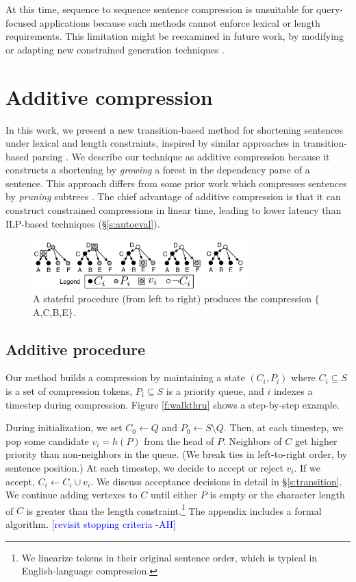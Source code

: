 \documentclass[11pt,a4paper]{article}
\newcommand{\ahcomment}[1]{\textcolor{blue}{[#1 -AH]}}
\begin{document}
At this time, sequence to sequence sentence compression \cite{filippova2015sentence} is unsuitable for query-focused applications because such methods cannot enforce lexical or length requirements. This limitation might be reexamined in future work, by modifying or adapting new constrained generation techniques \cite{N18-1119,aaimh}.

\section{Additive compression}\label{s:system}

In this work, we present a new transition-based method for shortening sentences under lexical and length constraints, inspired by similar approaches in transition-based parsing \cite{nivre2003}. We describe our technique as additive compression because it constructs a shortening by \textit{growing} a forest in the dependency parse of a sentence. This approach differs from some prior work which
compresses sentences by \textit{pruning} subtrees \cite{Knight2000StatisticsBasedS,berg2011jointly,almeida2013fast,Filippova2015FastKS}. The chief advantage of additive compression is that it can construct constrained compressions in linear time, leading to lower latency than ILP-based techniques (\S\ref{s:autoeval}).


\begin{figure}[h]
\includegraphics[width=8.2cm]{additive.pdf}
\caption{A stateful procedure (from left to right) produces the compression $\{$A,C,B,E$\}$.}
\end{figure}\label{f:walkthru}

\subsection{Additive procedure}\label{s:formal}

Our method builds a compression by maintaining a state
$(C_i,P_i)$ where $C_i \subseteq S$ is a set of compression tokens, $P_i  \subseteq S$ is a priority queue, and $i$ indexes a timestep during compression. Figure \ref{f:walkthru} shows a step-by-step example. 

During initialization, we set $C_0 \gets Q$ and $P_0 \gets S \setminus Q$. Then, at each timestep, we pop some candidate $v_i =h(P)$ from the head of $P$. Neighbors of $C$ get higher priority than non-neighbors in the queue. (We break ties in left-to-right order, by sentence position.) At each timestep, we decide to accept or reject $v_i$. If we accept, $C_i \gets C_i \cup v_i$. We discuss acceptance decisions in detail in \S\ref{s:transition}. We continue adding vertexes to $C$ until either $P$ is empty or the character length of $C$ is greater than the length constraint.\footnote{We linearize tokens in their original sentence order, which is typical in English-language compression.} The appendix includes a formal algorithm. \ahcomment{revisit stopping criteria}
\end{document}
